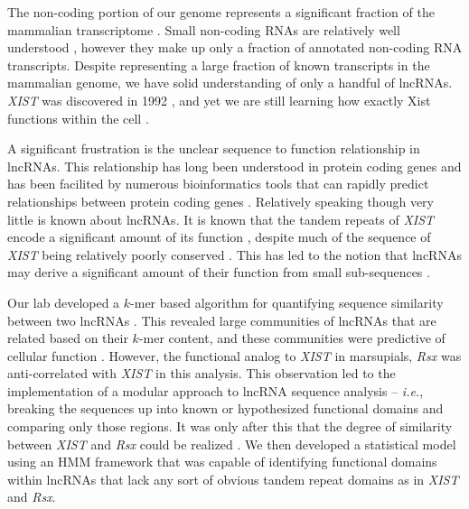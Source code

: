 The non-coding portion of our genome represents a significant fraction of the mammalian transcriptome \cite{Rinn2012GenomeRNAs}. Small non-coding RNAs are relatively well understood \cite{Rinn2012GenomeRNAs}, however they make up only a fraction of annotated non-coding RNA transcripts. Despite representing a large fraction of known transcripts in the mammalian genome, we have solid understanding of only a handful of lncRNAs. \emph{XIST} was discovered in 1992 \cite{Brown10TheNucleus.}, and yet we are still learning how exactly Xist functions within the cell \cite{Schertzer2019LncRNA-InducedDNA,DaRocha2017NovelConformation}. 

A significant frustration is the unclear sequence to function relationship in lncRNAs. This relationship has long been understood in protein coding genes \cite{Whisstock2003PredictionStructure} and has been facilited by numerous bioinformatics tools that can rapidly predict relationships between protein coding genes \cite{Altschul1990BasicTool,Smith1981IdentificationSubsequences,Wheeler2013Nhmmer:HMMs,Yi2013Co-phylog:Organisms,Qi2004WholeApproach}. Relatively speaking though very little is known about lncRNAs. It is known that the tandem repeats of \emph{XIST} encode a significant amount of its function \cite{Nesterova2001CharacterizationSequence,Wang2017TargetingGuanines,Hoki2009AMouse,Zhao2008PolycombChromosome,Pintacuda2017HnRNPKSilencing}, despite much of the sequence of \emph{XIST} being relatively poorly conserved \cite{Nesterova2001CharacterizationSequence}. This has led to the notion that lncRNAs may derive a significant amount of their function from small sub-sequences \cite{Brockdorff2018LocalNcRNA, Sprague2019NonlinearDomains}. 

Our lab developed a $k$-mer based algorithm for quantifying sequence similarity between two lncRNAs \cite{Kirk2018FunctionalContent}. This revealed large communities of lncRNAs that are related based on their $k$-mer content, and these communities were predictive of cellular function \cite{Kirk2018FunctionalContent}. However, the functional analog to \emph{XIST} in marsupials, \emph{Rsx} was anti-correlated with \emph{XIST} in this analysis. This observation led to the implementation of a modular approach to lncRNA sequence analysis -- \emph{i.e.}, breaking the sequences up into known or hypothesized functional domains and comparing only those regions. It was only after this that the degree of similarity between \emph{XIST} and \emph{Rsx} could be realized \cite{Sprague2019NonlinearDomains}. We then developed a statistical model using an HMM framework that was capable of identifying functional domains within lncRNAs that lack any sort of obvious tandem repeat domains as in \emph{XIST} and \emph{Rsx}. 

